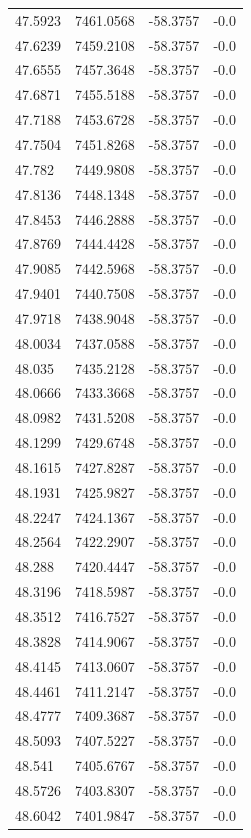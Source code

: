 \begin{table}[H]
\begin{tabular}{llll}
47.5923 & 7461.0568 & -58.3757 & -0.0 \\
47.6239 & 7459.2108 & -58.3757 & -0.0 \\
47.6555 & 7457.3648 & -58.3757 & -0.0 \\
47.6871 & 7455.5188 & -58.3757 & -0.0 \\
47.7188 & 7453.6728 & -58.3757 & -0.0 \\
47.7504 & 7451.8268 & -58.3757 & -0.0 \\
47.782 & 7449.9808 & -58.3757 & -0.0 \\
47.8136 & 7448.1348 & -58.3757 & -0.0 \\
47.8453 & 7446.2888 & -58.3757 & -0.0 \\
47.8769 & 7444.4428 & -58.3757 & -0.0 \\
47.9085 & 7442.5968 & -58.3757 & -0.0 \\
47.9401 & 7440.7508 & -58.3757 & -0.0 \\
47.9718 & 7438.9048 & -58.3757 & -0.0 \\
48.0034 & 7437.0588 & -58.3757 & -0.0 \\
48.035 & 7435.2128 & -58.3757 & -0.0 \\
48.0666 & 7433.3668 & -58.3757 & -0.0 \\
48.0982 & 7431.5208 & -58.3757 & -0.0 \\
48.1299 & 7429.6748 & -58.3757 & -0.0 \\
48.1615 & 7427.8287 & -58.3757 & -0.0 \\
48.1931 & 7425.9827 & -58.3757 & -0.0 \\
48.2247 & 7424.1367 & -58.3757 & -0.0 \\
48.2564 & 7422.2907 & -58.3757 & -0.0 \\
48.288 & 7420.4447 & -58.3757 & -0.0 \\
48.3196 & 7418.5987 & -58.3757 & -0.0 \\
48.3512 & 7416.7527 & -58.3757 & -0.0 \\
48.3828 & 7414.9067 & -58.3757 & -0.0 \\
48.4145 & 7413.0607 & -58.3757 & -0.0 \\
48.4461 & 7411.2147 & -58.3757 & -0.0 \\
48.4777 & 7409.3687 & -58.3757 & -0.0 \\
48.5093 & 7407.5227 & -58.3757 & -0.0 \\
48.541 & 7405.6767 & -58.3757 & -0.0 \\
48.5726 & 7403.8307 & -58.3757 & -0.0 \\
48.6042 & 7401.9847 & -58.3757 & -0.0 \\

\end{tabular}
\end{table}
